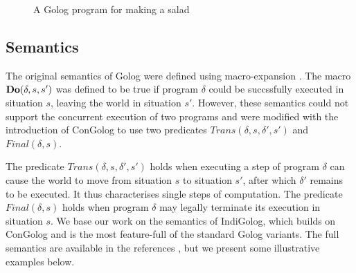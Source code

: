 %
\begin{figure}
\begin{centering}
\par\end{centering}

\caption{A Golog program for making a salad\label{fig:Background:Golog:MakeSalad}}

\end{figure}



\subsection{Semantics}

The original semantics of Golog were defined using macro-expansion
\citep{levesque97golog}. The macro $\mathbf{Do}(\delta,s,s')$ was defined
to be true if program $\delta$ could be succssfully executed in situation
$s$, leaving the world in situation $s'$. However, these semantics
could not support the concurrent execution of two programs and were
modified with the introduction of ConGolog \citep{giacomo00congolog}
to use two predicates $Trans(\delta,s,\delta',s')$ and $Final(\delta,s)$.

The predicate $Trans(\delta,s,\delta',s')$ holds when executing a
step of program $\delta$ can cause the world to move from situation
$s$ to situation $s'$, after which $\delta'$ remains to be executed.
It thus characterises single steps of computation. The predicate $Final(\delta,s)$
holds when program $\delta$ may legally terminate its execution in
situation $s$. We base our work on the semantics of IndiGolog, which
builds on ConGolog and is the most feature-full of the standard Golog
variants. The full semantics are available in the references \citep{giacomo00congolog,giacomo99indigolog},
but we present some illustrative examples below.

